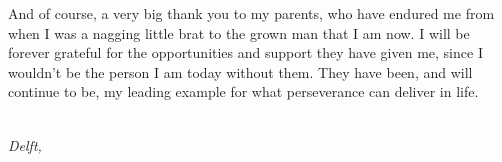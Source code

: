 And of course, a very big thank you to my parents, who have endured me from when I was a nagging little brat to the grown man that I am now. I will be forever grateful for the opportunities and support they have given me, since I wouldn't be the person I am today without them. They have been, and will continue to be, my leading example for what perseverance can deliver in life. 


\begin{flushright}
{\makeatletter\itshape
    \@author \\
    Delft, \monthname{} \the\year{}
\makeatother}
\end{flushright}
